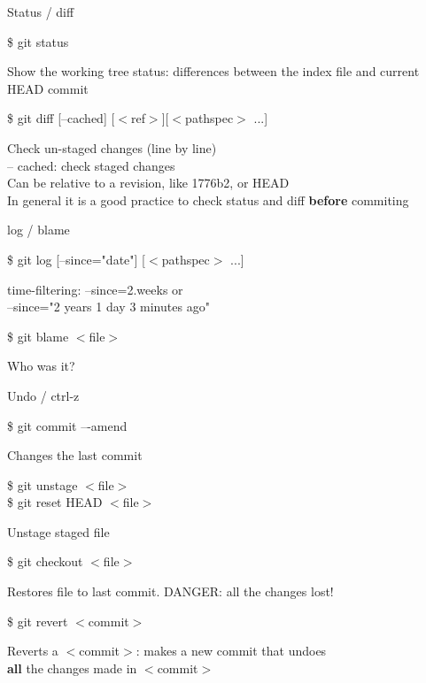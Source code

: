 \documentclass[10pt,xcolor=dvipsnames]{beamer}
\begin{document}
\begin{frame}{Status / diff }
\begin{block}{}
\$ git status 
\end{block}
Show the working tree status: differences between the index file and current HEAD commit\\[0.4in]
\begin{block}{}
\$ git diff [--cached] [$<$ref$>$][$<$pathspec$>$ ...]
\end{block}
Check un-staged changes (line by line)\\
-- cached: check staged changes\\
Can be relative to a revision, like 1776b2, or HEAD\\[0.4in]

In general it is a good practice to check status and diff {\bf before} commiting
\end{frame}

\begin{frame}{log / blame }
\begin{block}{}
\$ git log [--since="date"] [$<$pathspec$>$ ...]
\end{block}
time-filtering: --since=2.weeks or\\
--since="2 years 1 day 3 minutes ago"\\[0.4in]

\begin{block}{}
\$ git blame $<$file$>$ 
\end{block}
Who was it?
\end{frame}


\begin{frame}{Undo / ctrl-z}
\begin{block}{}
\$ git commit –-amend
\end{block}
Changes the last commit
\begin{block}{}
\$ git unstage $<$file$>$ \\
\$ git reset HEAD $<$file$>$
\end{block}
Unstage staged file
\begin{block}{}
\$ git checkout $<$file$>$
\end{block}
Restores file to last commit. DANGER: all the changes lost!
\begin{block}{}
\$ git revert $<$commit$>$
\end{block}
Reverts a $<$commit$>$: makes a new commit that undoes \\ {\bf all} the changes made in $<$commit$>$
\end{frame}
\end{document}
